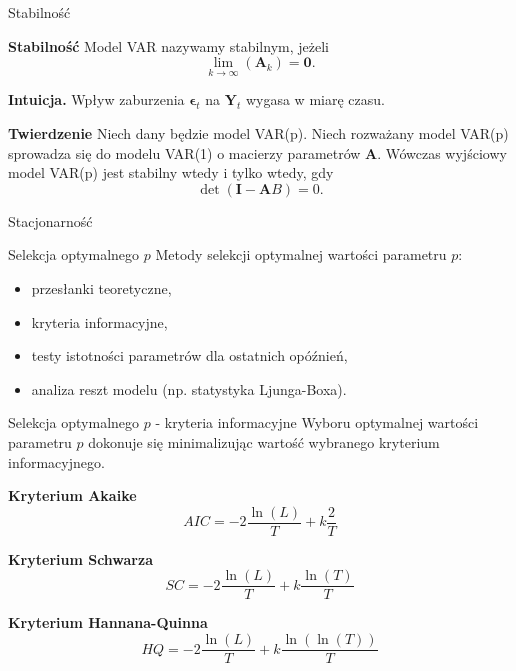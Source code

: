 \documentclass[a4paper, 11pt]{beamer}
\begin{document}
	\begin{frame}{Stabilność}
		\begin{block}{\textbf{Stabilność}}
			Model VAR nazywamy stabilnym, jeżeli \[
				\lim_{k\rightarrow\infty}\left(\boldsymbol{A}_k\right) = 
					\boldsymbol{0}.
			\]
		\end{block}
		\begin{alert}{\textbf{Intuicja.}}
			Wpływ zaburzenia $\boldsymbol{\epsilon}_t$ na
			$\boldsymbol{Y}_t$ wygasa w miarę czasu.
		\end{alert}
		\begin{block}{\textbf{Twierdzenie}}
			Niech dany będzie model VAR(p). Niech rozważany model VAR(p)
			sprowadza się do modelu VAR(1) o macierzy parametrów
			$\boldsymbol{A}.$ Wówczas wyjściowy model VAR(p) jest 
			stabilny wtedy i tylko wtedy, gdy \[
				\det\left(\boldsymbol{I} - \boldsymbol{A} B\right) = 0.
			\]
		\end{block}
	\end{frame}
	
	\begin{frame}{Stacjonarność}
	\end{frame}

	\begin{frame}{Selekcja optymalnego $p$}
		Metody selekcji optymalnej wartości parametru $p:$
		\begin{itemize}
			\item przesłanki teoretyczne,
			\item kryteria informacyjne,
			\item testy istotności parametrów dla ostatnich opóźnień,
			\item analiza reszt modelu (np. statystyka Ljunga-Boxa).
		\end{itemize}
	\end{frame}
	
	\begin{frame}{Selekcja optymalnego $p$ - kryteria informacyjne}
		Wyboru optymalnej wartości parametru $p$ dokonuje się 
		minimalizując wartość wybranego kryterium informacyjnego.
		\begin{block}{\textbf{Kryterium Akaike}}
			\[
				AIC =
					-2\frac{\ln\left(L\right)}{T} + 
					k\frac{2}{T}
			\]
		\end{block}
		\begin{block}{\textbf{Kryterium Schwarza}}
			\[
				SC =
					-2\frac{\ln\left(L\right)}{T} +
					k \frac{\ln\left(T\right)}{T}
			\]
		\end{block}
		\begin{block}{\textbf{Kryterium Hannana-Quinna}}
			\[
				HQ = 
					-2\frac{\ln\left(L\right)}{T} +
					k \frac{\ln\left(\ln\left(T\right)\right)}{T}
			\]
		\end{block}
	\end{frame}
\end{document}

